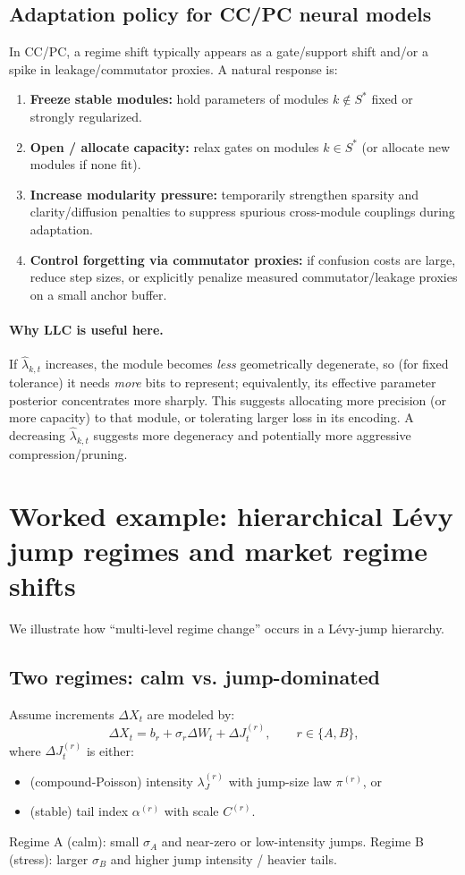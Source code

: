 \documentclass[11pt]{article}
\begin{document}
\subsection{Adaptation policy for CC/PC neural models}
In CC/PC, a regime shift typically appears as a gate/support shift and/or a spike in leakage/commutator proxies.
A natural response is:
\begin{enumerate}
  \item \textbf{Freeze stable modules:} hold parameters of modules $k\notin S^\ast$ fixed or strongly regularized.
  \item \textbf{Open / allocate capacity:} relax gates on modules $k\in S^\ast$ (or allocate new modules if none fit).
  \item \textbf{Increase modularity pressure:} temporarily strengthen sparsity and clarity/diffusion penalties to suppress
        spurious cross-module couplings during adaptation.
  \item \textbf{Control forgetting via commutator proxies:} if confusion costs are large, reduce step sizes, or explicitly
        penalize measured commutator/leakage proxies on a small anchor buffer.
\end{enumerate}

\paragraph{Why LLC is useful here.}
If $\hat\lambda_{k,t}$ increases, the module becomes \emph{less} geometrically degenerate, so (for fixed tolerance)
it needs \emph{more} bits to represent; equivalently, its effective parameter posterior concentrates more sharply.
This suggests allocating more precision (or more capacity) to that module, or tolerating larger loss in its encoding.
A decreasing $\hat\lambda_{k,t}$ suggests more degeneracy and potentially more aggressive compression/pruning.

\section{Worked example: hierarchical L\'evy jump regimes and market regime shifts}
We illustrate how ``multi-level regime change'' occurs in a L\'evy-jump hierarchy.

\subsection{Two regimes: calm vs. jump-dominated}
Assume increments $\Delta X_t$ are modeled by:
\[
\Delta X_t = b_r + \sigma_r \Delta W_t + \Delta J_t^{(r)}, \qquad r \in \{A,B\},
\]
where $\Delta J_t^{(r)}$ is either:
\begin{itemize}
  \item (compound-Poisson) intensity $\lambda^{(r)}_J$ with jump-size law $\pi^{(r)}$, or
  \item (stable) tail index $\alpha^{(r)}$ with scale $C^{(r)}$.
\end{itemize}
Regime A (calm): small $\sigma_A$ and near-zero or low-intensity jumps.
Regime B (stress): larger $\sigma_B$ and higher jump intensity / heavier tails.
\end{document}
